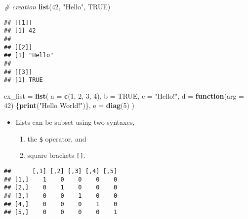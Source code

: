 \documentclass[]{book}
\newenvironment{Shaded}{\begin{snugshade}}{\end{snugshade}}
\newcommand{\CommentTok}[1]{\textcolor[rgb]{0.56,0.35,0.01}{\textit{#1}}}
\newcommand{\ControlFlowTok}[1]{\textcolor[rgb]{0.13,0.29,0.53}{\textbf{#1}}}
\newcommand{\DataTypeTok}[1]{\textcolor[rgb]{0.13,0.29,0.53}{#1}}
\newcommand{\DecValTok}[1]{\textcolor[rgb]{0.00,0.00,0.81}{#1}}
\newcommand{\KeywordTok}[1]{\textcolor[rgb]{0.13,0.29,0.53}{\textbf{#1}}}
\newcommand{\NormalTok}[1]{#1}
\newcommand{\OperatorTok}[1]{\textcolor[rgb]{0.81,0.36,0.00}{\textbf{#1}}}
\newcommand{\OtherTok}[1]{\textcolor[rgb]{0.56,0.35,0.01}{#1}}
\newcommand{\StringTok}[1]{\textcolor[rgb]{0.31,0.60,0.02}{#1}}
\providecommand{\tightlist}{%
  \setlength{\itemsep}{0pt}\setlength{\parskip}{0pt}}
\begin{document}
\begin{Shaded}
\begin{Highlighting}[]
\CommentTok{# creation}
\KeywordTok{list}\NormalTok{(}\DecValTok{42}\NormalTok{, }\StringTok{"Hello"}\NormalTok{, }\OtherTok{TRUE}\NormalTok{)}
\end{Highlighting}
\end{Shaded}

\begin{verbatim}
## [[1]]
## [1] 42
## 
## [[2]]
## [1] "Hello"
## 
## [[3]]
## [1] TRUE
\end{verbatim}

\begin{Shaded}
\begin{Highlighting}[]
\NormalTok{ex_list =}\StringTok{ }\KeywordTok{list}\NormalTok{(}
  \DataTypeTok{a =} \KeywordTok{c}\NormalTok{(}\DecValTok{1}\NormalTok{, }\DecValTok{2}\NormalTok{, }\DecValTok{3}\NormalTok{, }\DecValTok{4}\NormalTok{),}
  \DataTypeTok{b =} \OtherTok{TRUE}\NormalTok{,}
  \DataTypeTok{c =} \StringTok{"Hello!"}\NormalTok{,}
  \DataTypeTok{d =} \ControlFlowTok{function}\NormalTok{(}\DataTypeTok{arg =} \DecValTok{42}\NormalTok{) \{}\KeywordTok{print}\NormalTok{(}\StringTok{"Hello World!"}\NormalTok{)\},}
  \DataTypeTok{e =} \KeywordTok{diag}\NormalTok{(}\DecValTok{5}\NormalTok{)}
\NormalTok{)}
\end{Highlighting}
\end{Shaded}

\begin{itemize}
\tightlist
\item
  Lists can be subset using two syntaxes,

  \begin{enumerate}
  \def\labelenumi{\arabic{enumi}.}
  \tightlist
  \item
    the \texttt{\$} operator, and
  \item
    square brackets \texttt{{[}{]}}.
  \end{enumerate}
\end{itemize}

\begin{Shaded}
\end{Shaded}

\begin{verbatim}
##      [,1] [,2] [,3] [,4] [,5]
## [1,]    1    0    0    0    0
## [2,]    0    1    0    0    0
## [3,]    0    0    1    0    0
## [4,]    0    0    0    1    0
## [5,]    0    0    0    0    1
\end{verbatim}
\end{document}

